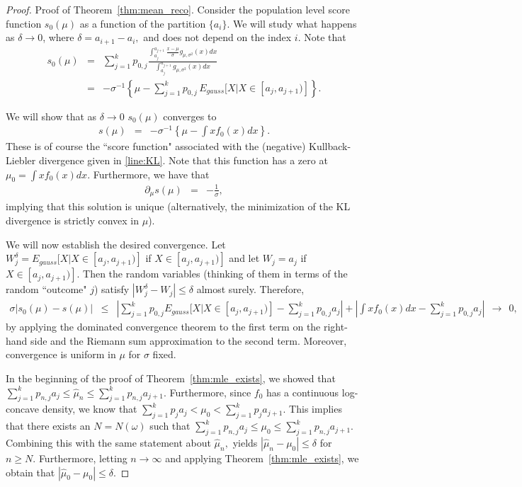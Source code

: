 \documentclass[12pt]{article} %
\begin{document}
\noindent\begin{proof}{Proof of Theorem~\ref{thm:mean_reco}.}
Consider the population level score function $s_0(\mu)$ as a function of the partition $\{a_i\}.$   We will study what happens as $\delta\rightarrow 0$, where $\delta=a_{i+1}-a_i,$ and does not depend on the index $i.$  Note that
\begin{eqnarray*}
s_0(\mu) &=&  \sum_{j=1}^k p_{0,j} \frac{\int_{a_j}^{a_{j+1}}  \frac{x-\mu}{\sigma} g_{\mu, \sigma^2}(x)dx}{\int_{a_j}^{a_{j+1}}  g_{\mu, \sigma^2}(x)dx} \\
&=&- \sigma^{-1} \left\{\mu - \sum_{j=1}^k p_{0,j} \, E_{gauss}[X|X\in[a_j, a_{j+1})] \right\}.
\end{eqnarray*}

We will show that as $\delta \rightarrow 0$ $s_0(\mu)$ converges to 
\begin{eqnarray*}
s(\mu) &=&  - \sigma^{-1} \left\{\mu - \int x f_0(x)dx \right\}.
\end{eqnarray*}
These is of course the ``score function" associated with the (negative) Kullback-Liebler divergence given in \eqref{line:KL}.  Note that this function has  a zero at $\mu_0=\int x f_0(x)dx.$ Furthermore, we have that 
\begin{eqnarray*}
\partial_\mu s (\mu) &=& -\frac{1}{\sigma},
\end{eqnarray*}
implying that this solution is unique (alternatively, the minimization of the KL divergence is strictly convex in $\mu$). 

We will now establish the desired convergence.   Let $W_{j}^\delta=E_{gauss}[X|X\in[a_j, a_{j+1})]$ if $X\in [a_j, a_{j+1})]$ and let $W_{j}=a_j$ if $X\in [a_j, a_{j+1})].$   Then the random variables (thinking of them in terms of the random ``outcome" $j$) satisfy $|W_{j}^\delta-W_{j}|\leq \delta$ almost surely.   Therefore, 
\begin{eqnarray*}
\sigma \left \vert s_0(\mu)-s(\mu)\right \vert &\leq & \left \vert \sum_{j=1}^k p_{0,j} E_{gauss}[X|X\in[a_j, a_{j+1})] -\sum_{j=1}^k p_{0,j} a_j \right \vert + \left \vert \int x f_0(x)dx -\sum_{j=1}^k p_{0,j} a_j\right \vert \ \ \rightarrow \ \ 0,
\end{eqnarray*}
by applying the dominated convergence theorem to the first term on the right-hand side and the Riemann sum approximation to the second term. Moreover, convergence is uniform in $\mu$ for $\sigma$ fixed.  

In the beginning of the proof of Theorem~\ref{thm:mle_exists}, we showed that $\sum_{j=1}^k p_{n,j}a_{j} \leq \widehat \mu_n \leq \sum_{j=1}^k p_{n,j}a_{j+1}.$   Furthermore, since $f_0$ has a continuous log-concave density, we know that $\sum_{j=1}^k p_{j}a_{j} < \mu_0 < \sum_{j=1}^k p_{j}a_{j+1}.$    This implies that there exists an $N=N(\omega)$ such that $\sum_{j=1}^k p_{n,j}a_{j} \leq \mu_0 \leq \sum_{j=1}^k p_{n,j}a_{j+1}.$  Combining this with the same statement about $\widehat \mu_n,$ yields $|\widehat \mu_n - \mu_0| \leq \delta$ for $n\geq N.$  Furthermore, letting $n\rightarrow\infty$ and applying Theorem~\ref{thm:mle_exists}, we obtain that $|\widehat \mu_0 - \mu_0| \leq \delta$.


\end{proof}
\end{document}
